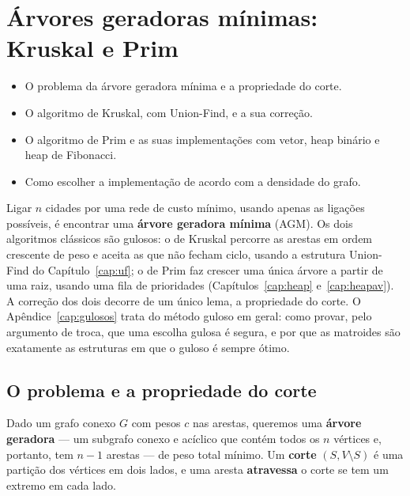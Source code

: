 \chapter{Árvores geradoras mínimas: Kruskal e Prim}\label{cap:agm}\label{sec:agm}
\begin{objetivos}
\begin{itemize}
  \item O problema da árvore geradora mínima e a propriedade do corte.
  \item O algoritmo de Kruskal, com Union-Find, e a sua correção.
  \item O algoritmo de Prim e as suas implementações com vetor, heap binário e heap de Fibonacci.
  \item Como escolher a implementação de acordo com a densidade do grafo.
\end{itemize}
\end{objetivos}

Ligar $n$ cidades por uma rede de custo mínimo, usando apenas as ligações possíveis, é encontrar uma \textbf{árvore geradora mínima} (AGM). Os dois algoritmos clássicos são gulosos: o de Kruskal percorre as arestas em ordem crescente de peso e aceita as que não fecham ciclo, usando a estrutura Union-Find do Capítulo~\ref{cap:uf}; o de Prim faz crescer uma única árvore a partir de uma raiz, usando uma fila de prioridades (Capítulos~\ref{cap:heap} e~\ref{cap:heapav}). A correção dos dois decorre de um único lema, a propriedade do corte. O Apêndice~\ref{cap:gulosos} trata do método guloso em geral: como provar, pelo argumento de troca, que uma escolha gulosa é segura, e por que as matroides são exatamente as estruturas em que o guloso é sempre ótimo.

\section{O problema e a propriedade do corte}\label{sec:corte}
Dado um grafo conexo $G$ com pesos $c$ nas arestas, queremos uma \textbf{árvore geradora} --- um subgrafo conexo e acíclico que contém todos os $n$ vértices e, portanto, tem $n-1$ arestas --- de peso total mínimo. Um \textbf{corte} $(S,V\setminus S)$ é uma partição dos vértices em dois lados, e uma aresta \textbf{atravessa} o corte se tem um extremo em cada lado.

